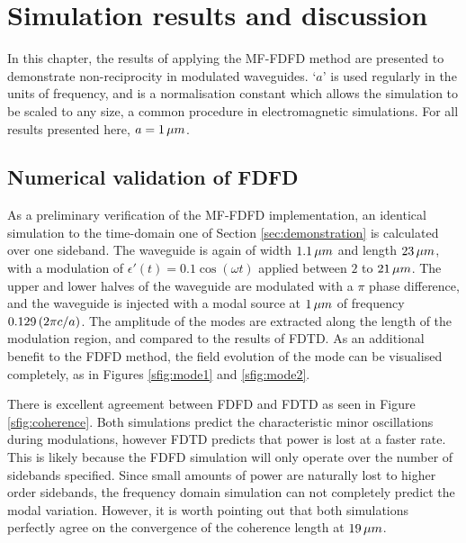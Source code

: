 \chapter{Simulation results and discussion}
\label{chapter:results}

In this chapter, the results of applying the MF-FDFD method are presented to demonstrate non-reciprocity in modulated waveguides. `$a$' is used regularly in the units of frequency, and is a normalisation constant which allows the simulation to be scaled to any size, a common procedure in electromagnetic simulations. For all results presented here, $a = 1  \mskip3mu \mu m$.

\section{Numerical validation of FDFD}

As a preliminary verification of the MF-FDFD implementation, an identical simulation to the time-domain one of Section \ref{sec:demonstration} is calculated over one sideband. The waveguide is again of width $1.1 \mskip3mu \mu m$ and length $23  \mskip3mu \mu m$, with a modulation of $\epsilon'(t) = 0.1 \cos (\omega t)$ applied between $2$ to $21  \mskip3mu \mu m$. The upper and lower halves of the waveguide are modulated with a $\pi$ phase difference, and the waveguide is injected with a modal source at $1  \mskip3mu \mu m$ of frequency $0.129  \mskip3mu (2 \pi c/a)$. The amplitude of the modes are extracted along the length of the modulation region, and compared to the results of FDTD. As an additional benefit to the FDFD method, the field evolution of the mode can be visualised completely, as in Figures \ref{sfig:mode1} and \ref{sfig:mode2}. 

There is excellent agreement between FDFD and FDTD as seen in Figure \ref{sfig:coherence}. Both simulations predict the characteristic minor oscillations during modulations, however FDTD predicts that power is lost at a faster rate. This is likely because the FDFD simulation will only operate over the number of sidebands specified. Since small amounts of power are naturally lost to higher order sidebands, the frequency domain simulation can not completely predict the modal variation. However, it is worth pointing out that both simulations perfectly agree on the convergence of the coherence length at $19 \mskip3mu  \mu m$. 

